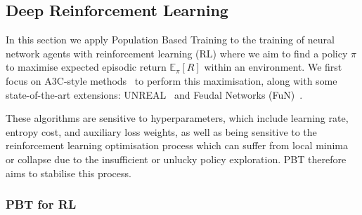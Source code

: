 \subsection{Deep Reinforcement Learning}\label{sec:deeprl}
In this section we apply Population Based Training to the training of neural network agents with reinforcement learning (RL)
%
where we aim to find a policy $\pi$ to maximise expected episodic return $\mathbb{E}_\pi[R]$ within an environment. 
%
We first focus on A3C-style methods~\cite{mnih2016asynchronous} to perform this maximisation, along with some state-of-the-art extensions: UNREAL~\citep{jaderberg2016reinforcement} and Feudal Networks (FuN)~\citep{vezhnevets2017feudal}.

These algorithms are sensitive to hyperparameters, which include learning rate, entropy cost, and auxiliary loss weights, as well as being sensitive to the reinforcement learning optimisation process which can suffer from local minima or collapse due to the insufficient or unlucky policy exploration. PBT therefore aims to stabilise this process.

\subsubsection{PBT for RL}\label{sec:pbtforrl}

